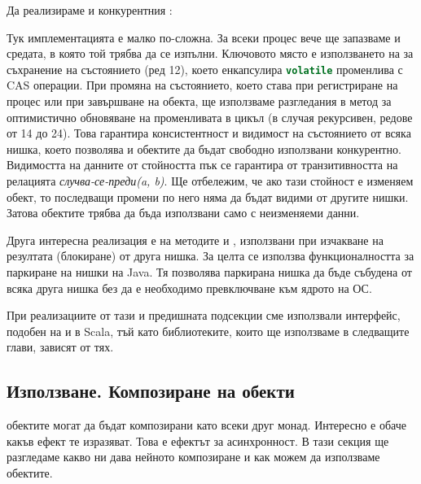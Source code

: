 Да реализираме и конкурентния :



Тук имплементацията е малко по-сложна. За всеки процес вече ще запазваме и средата, в която той трябва да се изпълни. Ключовото място е използването на  за съхранение на състоянието (ред 12), което енкапсулира \lstinline[language=Java]{volatile} променлива с CAS операции. При промяна на състоянието, което става при регистриране на процес или при завършване на  обекта, ще използваме разгледания в  метод за оптимистично обновяване на променливата в цикъл (в случая рекурсивен, редове от 14 до 24). Това гарантира консистентност и видимост на състоянието от всяка нишка, което позволява  и  обектите да бъдат свободно използвани конкурентно. Видимостта на данните от стойността пък се гарантира от транзитивността на релацията \emph{случва-се-преди(a, b)}. Ще отбележим, че ако тази стойност е изменяем обект, то последващи промени по него няма да бъдат видими от другите нишки. Затова  обектите трябва да бъда използвани само с неизменяеми данни.

Друга интересна реализация е на методите  и , използвани при изчакване на резултата (блокиране) от друга нишка. За целта се използва функционалността за паркиране на нишки на Java. Тя позволява паркирана нишка да бъде събудена от всяка друга нишка без да е необходимо превключване към ядрото на ОС.

При реализациите от тази и предишната подсекции сме използвали интерфейс, подобен на  и  в Scala, тъй като библиотеките, които ще използваме в следващите глави, зависят от тях.

\subsection{Използване. Композиране на  обекти}
\label{sec:composing-futures}

 обектите могат да бъдат композирани като всеки друг монад. Интересно е обаче какъв ефект те изразяват. Това е ефектът за асинхронност. В тази секция ще разгледаме какво ни дава нейното композиране и как можем да използваме  обектите.

